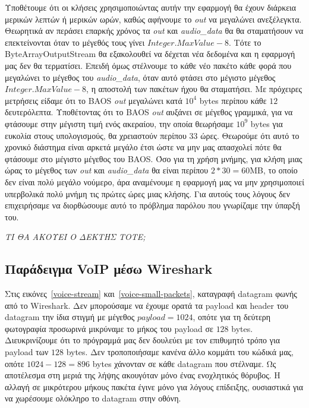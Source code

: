 \documentclass{article}
\begin{document}
Υποθέτουμε ότι οι κλήσεις χρησιμοποιώντας 
αυτήν την εφαρμογή θα έχουν διάρκεια μερικών λεπτών ή μερικών ωρών, καθώς αφήνουμε το \textit{out} να μεγαλώνει 
ανεξέλεγκτα. Θεωρητικά αν περάσει επαρκής χρόνος τα \textit{out} και \textit{audio\_data} θα 
θα σταματήσουν να επεκτείνονται όταν το μέγεθός τους γίνει $Integer.MaxValue - 8$. Τότε το ByteArrayOutputStream θα 
εξακολουθεί να δέχεται νέα δεδομένα και η εφαρμογή μας δεν θα τερματίσει. Επειδή όμως
στέλνουμε το κάθε νέο πακέτο κάθε φορά που μεγαλώνει το μέγεθος του \textit{audio\_data}, όταν αυτό φτάσει 
στο μέγιστο μέγεθος $Integer.MaxValue - 8$, η αποστολή των πακέτων ήχου θα σταματήσει. Με πρόχειρες 
μετρήσεις είδαμε ότι το BAOS \textit{out} μεγαλώνει κατά $10^4$ bytes περίπου κάθε $12$ δευτερόλεπτα. 
Υποθέτοντας ότι το BAOS \textit{out} αυξάνει σε μέγεθος γραμμικά, για να φτάσουμε στην μέγιστη τιμή ενός ακεραίου, 
την οποία θεωρήσαμε $10^9$ bytes για ευκολία στους υπολογισμούς, θα χρειαστούν περίπου $33$ ώρες. Θεωρούμε
ότι αυτό το χρονικό διάστημα είναι αρκετά μεγάλο έτσι ώστε να μην μας απασχολεί πότε θα φτάσουμε στο μέγιστο 
μέγεθος του BAOS. Όσο για τη χρήση μνήμης,
για κλήση μιας ώρας το μέγεθος των \textit{out} και \textit{audio\_data} θα είναι περίπου $2 * 30 = 60$MB,
το οποίο δεν είναι πολύ μεγάλο νούμερο, άρα αναμένουμε η εφαρμογή μας να μην χρησιμοποιεί υπερβολικά πολύ
μνήμη τις πρώτες ώρες μιας κλήσης. Για αυτούς τους λόγους δεν επιχειρήσαμε να διορθώσουμε αυτό το πρόβλημα
παρόλου που γνωρίζαμε την ύπαρξή του.


\emph{ΤΙ ΘΑ ΑΚΟΥΕΙ Ο ΔΕΚΤΗΣ ΤΟΤΕ;}

\subsection{Παράδειγμα VoIP μέσω Wireshark}
Στις εικόνες~\ref{voice-stream} και~\ref{voice-small-packets}, καταγραφή datagram φωνής από το Wireshark.
Δεν μπορούσαμε να έχουμε ορατά τα payload και header του datagram την ίδια στιγμή με μέγεθος $payload = 1024$,
οπότε για τη δεύτερη φωτογραφία προσωρινά μικρύναμε το μήκος του payload σε $128$ bytes. Διευκρινίζουμε ότι το 
πρόγραμμά μας δεν δουλεύει με τον επιθυμητό τρόπο για payload των $128$ bytes. Δεν τροποποιήσαμε κανένα
άλλο κομμάτι του κώδικά μας, οπότε $1024 - 128 = 896$ bytes χάνονταν σε κάθε datagram που στέλναμε.
Ως αποτέλεσμα στη μεριά της λήψης ακουγόταν μόνο ένας ενοχλητικός θόρυβος. Η αλλαγή σε μικρότερου μήκους πακέτα 
έγινε μόνο για λόγους επίδειξης, ουσιαστικά για να χωρέσουμε ολόκληρο το datagram στην οθόνη.
\end{document}
